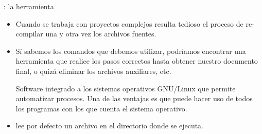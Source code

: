 \documentclass{beamer}
\begin{document}
\begin{frame}[fragile]{\insertsection: la herramienta }
  \begin{itemize}
  \item Cuando se trabaja con proyectos complejos resulta tedioso el
    proceso de re-compilar una y otra vez los archivos fuentes.
  \item Sí sabemos los comandos que debemos utilizar, podríamos
    encontrar una herramienta que realice los pasos correctos hasta
    obtener nuestro documento final, o quizá eliminar los archivos
    auxiliares, etc.
    
    \begin{block}{}
      {\scriptsize Software integrado a los sistemas operativos
      GNU/Linux que permite automatizar procesos. Una de las ventajas
      es que puede hacer uso de todos los programas con los que cuenta
      el sistema operativo.}
    \end{block}

  \item {} lee por defecto un archivo  en el
    directorio donde se ejecuta. 
  \end{itemize}
\end{frame}
\end{document}
